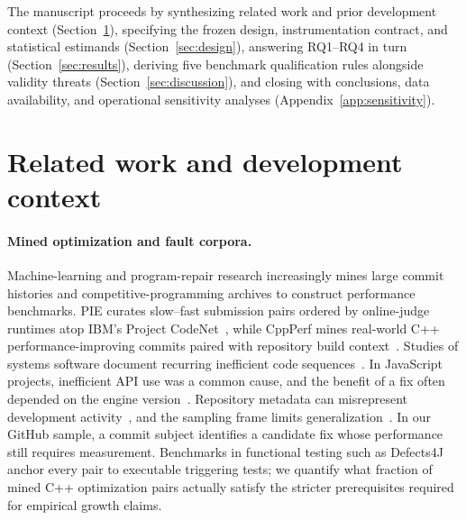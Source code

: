 \documentclass[11pt]{article}
\begin{document}
The manuscript proceeds by synthesizing related work and prior development context (Section~\ref{sec:related}), specifying the frozen design, instrumentation contract, and statistical estimands (Section~\ref{sec:design}), answering RQ1--RQ4 in turn (Section~\ref{sec:results}), deriving five benchmark qualification rules alongside validity threats (Section~\ref{sec:discussion}), and closing with conclusions, data availability, and operational sensitivity analyses (Appendix~\ref{app:sensitivity}).

\section{Related work and development context}
\label{sec:related}

\paragraph{Mined optimization and fault corpora.}
Machine-learning and program-repair research increasingly mines large commit histories and competitive-programming archives to construct performance benchmarks.
PIE curates slow--fast submission pairs ordered by online-judge runtimes atop IBM's Project CodeNet~\cite{shypula2024pie,puri2021codenet}, while CppPerf mines real-world C++ performance-improving commits paired with repository build context~\cite{ho2026cppperf}.
Studies of systems software document recurring inefficient code sequences~\cite{jin2012understanding}. In JavaScript projects, inefficient API use was a common cause, and the benefit of a fix often depended on the engine version~\cite{selakovic2016performance}.
Repository metadata can misrepresent development activity~\cite{kalliamvakou2014promises}, and the sampling frame limits generalization~\cite{baltes2022sampling}. In our GitHub sample, a commit subject identifies a candidate fix whose performance still requires measurement.
Benchmarks in functional testing such as Defects4J~\cite{just2014defects4j} anchor every pair to executable triggering tests; we quantify what fraction of mined C++ optimization pairs actually satisfy the stricter prerequisites required for empirical growth claims.
\end{document}
